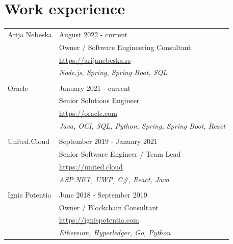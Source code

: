 \documentclass[a4paper]{article}
\begin{document}
\section{Work experience}
\begin{tabular}{@{}l | l}
    Arija Nebeska  & August 2022 - current                                       \\
                   & Owner / Software Engineering Consultant                     \\
                   & \href{https://arijanebeska.rs}{https://arijanebeska.rs}     \\
                   & \emph{Node.js, Spring, Spring Boot, SQL}                    \\
                   &                                                             \\
    Oracle         & January 2021 - current                                      \\
                   & Senior Solutions Engineer                                   \\
                   & \href{https://oracle.com}{https://oracle.com}               \\
                   & \emph{Java, OCI, SQL, Python, Spring, Spring Boot, React}   \\
                   &                                                             \\
    United.Cloud   & September 2019 - January 2021                               \\
                   & Senior Software Engineer / Team Lead                        \\
                   & \href{https://united.cloud}{https://united.cloud}           \\
                   & \emph{ASP.NET, UWP, C\#, React, Java}                       \\
                   &                                                             \\
    Ignis Potentia & June 2018 - September 2019                                  \\
                   & Owner / Blockchain Consultant                               \\
                   & \href{https://ignispotentia.com}{https://ignispotentia.com} \\
                   & \emph{Ethereum, Hyperledger, Go, Python}                    \\

\end{tabular}
\end{document}
